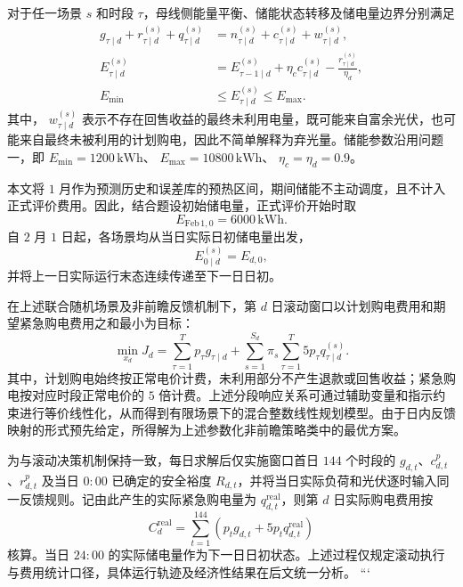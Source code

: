 \documentclass[zihao=-4,a4paper,UTF8,fontset=none]{ctexart}
\begin{document}
对于任一场景 $s$ 和时段 $\tau$，母线侧能量平衡、储能状态转移及储电量边界分别满足
\begin{equation}
\begin{aligned}
    g_{\tau\mid d}
    +
    r_{\tau\mid d}^{(s)}
    +
    q_{\tau\mid d}^{(s)}
    &=
    n_{\tau\mid d}^{(s)}
    +
    c_{\tau\mid d}^{(s)}
    +
    w_{\tau\mid d}^{(s)},
    \\
    E_{\tau\mid d}^{(s)}
    &=
    E_{\tau-1\mid d}^{(s)}
    +
    \eta_c c_{\tau\mid d}^{(s)}
    -
    \frac{r_{\tau\mid d}^{(s)}}{\eta_d},
    \\
    E_{\min}
    &\le
    E_{\tau\mid d}^{(s)}
    \le
    E_{\max}.
\end{aligned}
\label{eq:q2_physical_constraints}
\end{equation}
其中，
$w_{\tau\mid d}^{(s)}$
表示不存在回售收益的最终未利用电量，既可能来自富余光伏，也可能来自最终未被利用的计划购电，因此不简单解释为弃光量。储能参数沿用问题一，即
$E_{\min}=1200\,\mathrm{kWh}$、
$E_{\max}=10800\,\mathrm{kWh}$、
$\eta_c=\eta_d=0.9$。

本文将 $1$ 月作为预测历史和误差库的预热区间，期间储能不主动调度，且不计入正式评价费用。因此，结合题设初始储电量，正式评价开始时取
\[
E_{\mathrm{Feb\,1},0}
=
6000\,\mathrm{kWh}.
\]
自 $2$ 月 $1$ 日起，各场景均从当日实际日初储电量出发，
\[
E_{0\mid d}^{(s)}
=
E_{d,0},
\]
并将上一日实际运行末态连续传递至下一日日初。

在上述联合随机场景及非前瞻反馈机制下，第 $d$ 日滚动窗口以计划购电费用和期望紧急购电费用之和最小为目标：
\begin{equation}
    \boxed{
    \min_{x_d}J_d
    =
    \sum_{\tau=1}^{T}
        p_{\tau}g_{\tau\mid d}
    +
    \sum_{s=1}^{S_d}
        \pi_s
        \sum_{\tau=1}^{T}
            5p_{\tau}q_{\tau\mid d}^{(s)}
    }.
    \label{eq:q2_stochastic_objective}
\end{equation}
其中，计划购电始终按正常电价计费，未利用部分不产生退款或回售收益；紧急购电按对应时段正常电价的 $5$ 倍计费。上述分段响应关系可通过辅助变量和指示约束进行等价线性化，从而得到有限场景下的混合整数线性规划模型。由于日内反馈映射的形式预先给定，所得解为上述参数化非前瞻策略类中的最优方案。

为与滚动决策机制保持一致，每日求解后仅实施窗口首日 $144$ 个时段的
$g_{d,t}$、$c_{d,t}^{p}$、$r_{d,t}^{p}$ 及当日 $0{:}00$ 已确定的安全裕度 $R_{d,t}$，并将当日实际负荷和光伏逐时输入同一反馈规则。记由此产生的实际紧急购电量为
$q_{d,t}^{\mathrm{real}}$，则第 $d$ 日实际购电费用按
\begin{equation}
    C_d^{\mathrm{real}}
    =
    \sum_{t=1}^{144}
    \left(
        p_tg_{d,t}
        +
        5p_tq_{d,t}^{\mathrm{real}}
    \right)
    \label{eq:q2_real_cost}
\end{equation}
核算。当日 $24{:}00$ 的实际储电量作为下一日日初状态。上述过程仅规定滚动执行与费用统计口径，具体运行轨迹及经济性结果在后文统一分析。
```
\end{document}
